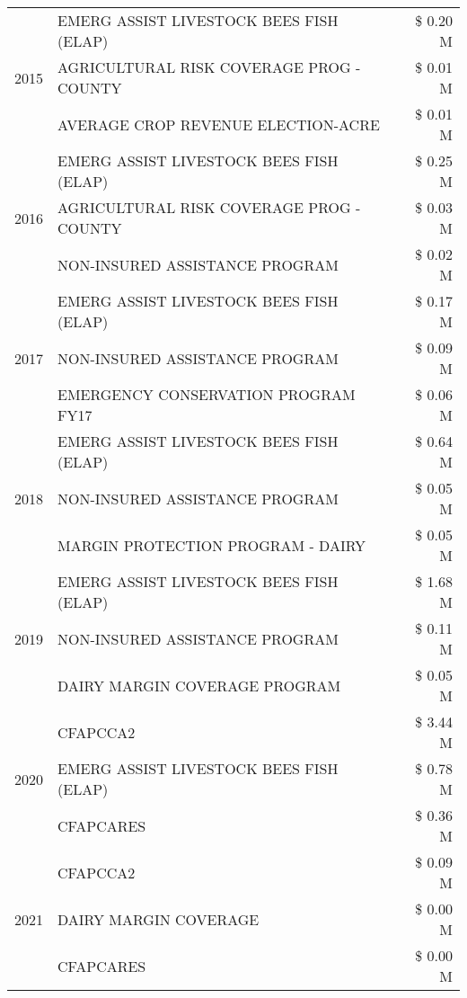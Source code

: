 \begin{tabular}{llr}
\cline{1-3}
\multirow[t]{3}{*}{2015} & EMERG ASSIST LIVESTOCK BEES FISH (ELAP) & \$ 0.20 M \\
 & AGRICULTURAL RISK COVERAGE PROG - COUNTY & \$ 0.01 M \\
 & AVERAGE CROP REVENUE ELECTION-ACRE & \$ 0.01 M \\
\cline{1-3}
\multirow[t]{3}{*}{2016} & EMERG ASSIST LIVESTOCK BEES FISH (ELAP) & \$ 0.25 M \\
 & AGRICULTURAL RISK COVERAGE PROG - COUNTY & \$ 0.03 M \\
 & NON-INSURED ASSISTANCE PROGRAM & \$ 0.02 M \\
\cline{1-3}
\multirow[t]{3}{*}{2017} & EMERG ASSIST LIVESTOCK BEES FISH (ELAP) & \$ 0.17 M \\
 & NON-INSURED ASSISTANCE PROGRAM & \$ 0.09 M \\
 & EMERGENCY CONSERVATION PROGRAM FY17 & \$ 0.06 M \\
\cline{1-3}
\multirow[t]{3}{*}{2018} & EMERG ASSIST LIVESTOCK BEES FISH (ELAP) & \$ 0.64 M \\
 & NON-INSURED ASSISTANCE PROGRAM & \$ 0.05 M \\
 & MARGIN PROTECTION PROGRAM - DAIRY & \$ 0.05 M \\
\cline{1-3}
\multirow[t]{3}{*}{2019} & EMERG ASSIST LIVESTOCK BEES FISH (ELAP) & \$ 1.68 M \\
 & NON-INSURED ASSISTANCE PROGRAM & \$ 0.11 M \\
 & DAIRY MARGIN COVERAGE PROGRAM & \$ 0.05 M \\
\cline{1-3}
\multirow[t]{3}{*}{2020} & CFAPCCA2 & \$ 3.44 M \\
 & EMERG ASSIST LIVESTOCK BEES FISH (ELAP) & \$ 0.78 M \\
 & CFAPCARES & \$ 0.36 M \\
\cline{1-3}
\multirow[t]{3}{*}{2021} & CFAPCCA2 & \$ 0.09 M \\
 & DAIRY MARGIN COVERAGE & \$ 0.00 M \\
 & CFAPCARES & \$ 0.00 M \\
\cline{1-3}
\bottomrule
\end{tabular}
